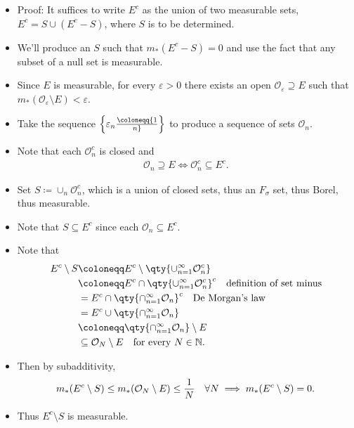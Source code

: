\begin{solution}
\begin{concept}
\begin{itemize}
  \begin{itemize}
  \tightlist
  \item
    Proof: It suffices to write \(E^c\) as the union of two measurable
    sets, \(E^c = S \cup(E^c - S)\), where \(S\) is to be determined.
  \item
    We'll produce an \(S\) such that \(m_*(E^c - S) = 0\) and use the
    fact that any subset of a null set is measurable.
  \item
    Since \(E\) is measurable, for every \(\varepsilon> 0\) there exists
    an open \({\mathcal{O}}_\varepsilon\supseteq E\) such that
    \(m_*({\mathcal{O}}_\varepsilon\setminus E) < \varepsilon\).
  \item
    Take the sequence
    \(\left\{{\varepsilon_n \coloneqq{1\over n}}\right\}\) to produce a
    sequence of sets \({\mathcal{O}}_n\).
  \item
    Note that each \({\mathcal{O}}_n^c\) is closed and
    \begin{align*}
    {\mathcal{O}}_n \supseteq E \iff {\mathcal{O}}_n^c \subseteq E^c
    .\end{align*}
  \item
    Set \(S \coloneqq\cup_n {\mathcal{O}}_n^c\), which is a union of
    closed sets, thus an \(F_\sigma\) set, thus Borel, thus measurable.
  \item
    Note that \(S\subseteq E^c\) since each
    \({\mathcal{O}}_n \subseteq E^c\).
  \item
    Note that
    \begin{align*}
    E^c\setminus S 
    &\coloneqq E^c \setminus \qty{\cup_{n=1}^\infty {\mathcal{O}}_n^c} \\
    &\coloneqq E^c \cap\qty{\cup_{n=1}^\infty {\mathcal{O}}_n^c}^c  \quad\text{definition of set minus} \\ 
    &= E^c \cap\qty{\cap_{n=1}^\infty {\mathcal{O}}_n}^c  \quad \text{De Morgan's law}\\
    &= E^c \cup\qty{\cap_{n=1}^\infty {\mathcal{O}}_n}  \\
    &\coloneqq\qty{ \cap_{n=1}^\infty {\mathcal{O}}_n} \setminus E \\
    & \subseteq {\mathcal{O}}_N \setminus E \quad \text{for every } N\in {\mathbb{N}}
    .\end{align*}
  \item
    Then by subadditivity,
    \begin{align*}
    m_*(E^c\setminus S) \leq m_*({\mathcal{O}}_N \setminus E) \leq {1\over N} \quad \forall N \implies m_*(E^c\setminus S) = 0
    .\end{align*}
  \item
    Thus \(E^c\setminus S\) is measurable.
  \end{itemize}
\end{itemize}


\end{concept}
\end{solution}
